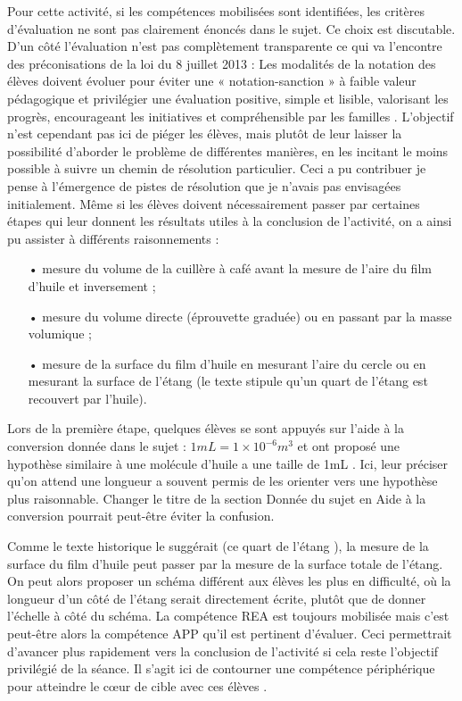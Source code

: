 \documentclass[12pt,a4paper, fleqn]{report}
\newcommand{\app}{\colorbox{bleu_c}{\textcolor{bleu_f}{APP}}}
\newcommand{\rea}{\colorbox{yellow_c}{\textcolor{yellow_f}{REA}}}
\begin{document}
Pour cette activité, si les compétences mobilisées sont identifiées, les critères d'évaluation ne sont pas clairement énoncés dans le sujet.
Ce choix est discutable.
D'un côté l'évaluation n'est pas complètement transparente  ce qui va l'encontre des préconisations de la loi du 8 juillet 2013 \cite{Loi2013} : \og Les modalités de la notation des élèves doivent évoluer pour éviter une « notation-sanction » à faible valeur pédagogique et privilégier une évaluation positive, simple et lisible, valorisant les progrès, encourageant les initiatives et compréhensible par les familles \fg{}.
L'objectif n'est cependant pas ici de piéger les élèves, mais plutôt de leur laisser la possibilité d'aborder le problème de différentes manières, en les incitant le moins possible à suivre un chemin de résolution particulier.
Ceci a pu contribuer je pense à l'émergence de pistes de résolution que je n'avais pas envisagées initialement.
Même si les élèves doivent nécessairement passer par certaines étapes qui leur donnent les résultats utiles à la conclusion de l'activité, on a ainsi pu assister à différents raisonnements : 
\begin{itemize}
\item[•] mesure du volume de la cuillère à café avant la mesure de l'aire du film d'huile et inversement ;
\item[•] mesure du volume directe (éprouvette graduée) ou en passant par la masse volumique ;
\item[•] mesure de la surface du film d'huile en mesurant l'aire du cercle ou en mesurant la surface de l'étang (le texte stipule qu'un quart de l'étang est recouvert par l'huile).
\end{itemize}

Lors de la première étape, quelques élèves se sont appuyés sur l'aide à la conversion donnée dans le sujet : $\unit{1}{mL} = \unit{1 \times 10^{-6}}{m^3} $ et ont proposé une hypothèse similaire à \og une molécule d'huile a une taille de \unit{1}{mL} \fg{}.
Ici, leur préciser qu'on attend une longueur a souvent permis de les orienter vers une hypothèse plus raisonnable.
Changer le titre de la section \og Donnée \fg{} du sujet en \og Aide à la conversion \fg{} pourrait peut-être éviter la confusion.

Comme le texte historique le suggérait (\og ce quart de l'étang \fg{}), la mesure de la surface du film d'huile peut passer par la mesure de la surface totale de l'étang.
On peut alors proposer un schéma différent aux élèves les plus en difficulté, où la longueur d'un côté de l'étang serait directement écrite, plutôt que de donner l'échelle à côté du schéma.
La compétence \rea{} est toujours mobilisée mais c'est peut-être alors la compétence \app{} qu'il est pertinent d'évaluer.
Ceci permettrait d'avancer plus rapidement vers la conclusion de l'activité si cela reste l'objectif privilégié de la séance.
Il s'agit ici de contourner une compétence périphérique pour atteindre le cœur de cible avec ces élèves \cite{Benoit2012}.
\end{document}
